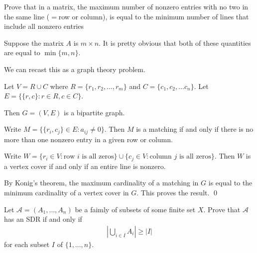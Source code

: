 \documentclass[10pt]{article}
\begin{document}
\maketitle


\begin{problem}[Problem 3.3]
Prove that in a matrix, the maximum number of nonzero entries with no two in the same line (\( = \)row or column), is equal to the minimum number of lines that include all nonzero entries
\end{problem}

\begin{solution}

Suppose the matrix \( A \) is \( m\times n \). It is pretty obvious that both of these quantities are equal to \( \min\{m,n\} \).

We can recast this as a graph theory problem.

Let \( V = R\cup C \) where \( R = \{ r_1, r_2, \ldots, r_m \} \) and \( C = \{ c_1, c_2, \ldots c_n \} \). Let \( E = \{ \{r,c\} : r\in R, c\in C \} \).

Then \( G = (V,E) \) is a bipartite graph. 

Write \( M = \{ \{r_i,c_j\} \in E : a_{ij} \neq 0 \} \). Then \( M \) is a matching if and only if there is no more than one nonzero entry in a given row or column.

Write \( W = \{ r_i \in V : \text{row } i\text{ is all zeros}\}\cup \{c_j\in V: \text{column }j \text{ is all zeros}\} \). Then \( W \) is a vertex cover if and only if an entire line is nonzero.

By Konig's theorem, the maximum cardinality of a matching in \( G \) is equal to the minimum cardinality of a vertex cover in \( G \). This proves the result. \qed

\end{solution}

\begin{problem}[Problem 3.5]
    Let \( \mathcal{A} = (A_1, \ldots, A_n) \) be a faimly of subsets of some finite set \( X \). Prove that \( \mathcal{A} \) has an SDR if and only if
    \begin{align*}
        \left| \bigcup_{i\in I} A_i \right| \geq \left| I \right| 
    \end{align*}
    for each subset \( I \) of \( \{1,\ldots,n\} \).
\end{problem}
\end{document}
